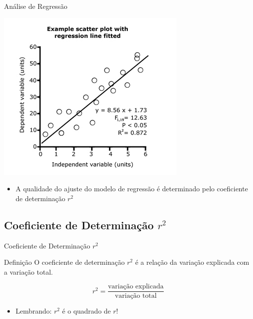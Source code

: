 \documentclass{beamer}
\begin{document}
\begin{frame}{Análise de Regressão}
  \begin{center}
      \includegraphics[height=0.6\textheight]{Cap18-19/residuos2}
  \end{center}

  \begin{itemize}
  \item A qualidade do ajuste do modelo de regressão é determinado
    pelo \alert{coeficiente de determinação} $r^2$
  \end{itemize}
\end{frame}


\subsection[$R^2$]{Coeficiente de Determinação $r^2$}

\begin{frame}{Coeficiente de Determinação $r^2$}
  \begin{block}{Definição}
    O \alert{coeficiente de determinação} $r^2$ é a relação da
    variação explicada com a variação total.
  \end{block}
  \begin{displaymath}
    r^2 = \frac{\text{variação explicada}}{\text{variação total}}
  \end{displaymath}
  \begin{itemize}
  \item Lembrando: $r^2$ é o quadrado de $r$!
  \end{itemize}
\end{frame}
\end{document}
